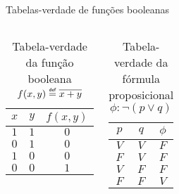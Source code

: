 \expandafter\documentclass\expandafter[table, usenames, svgnames, dvipsnames,14pt, \classopts]{beamer}
\newcommand\defeq{\mathrel{\overset{\makebox[0pt]{\mbox{\normalfont\tiny\sffamily def}}}{=}}}
\begin{document}
\begin{frame}{Tabelas-verdade de funções booleanas}

    \begin{columns}[c]
            \begin{center}
                \begin{table}
                    \caption{Tabela-verdade da função booleana $f(x,y) \defeq \overline{x + y}$}
                    \vspace{1em}
                    \begin{tabular}{cc|c}
                        $x$ & $y$ & $f(x,y)$\\
                        \hline
                        $1$ & $1$ & $0$\\
                        $0$ & $1$ & $0$\\
                        $1$ & $0$ & $0$\\
                        $0$ & $0$ & $1$\\
                    \end{tabular}
                \end{table}
            \end{center}

            \begin{center}
                \begin{table}
                    \caption{Tabela-verdade da fórmula proposicional $\phi: \lnot(p \lor q)$}
                    \vspace{1em}
                    \begin{tabular}{cc|c}
                        $p$ & $q$ & $\phi$\\
                        \hline
                        $V$ & $V$ & $F$\\
                        $F$ & $V$ & $F$\\
                        $V$ & $F$ & $F$\\
                        $F$ & $F$ & $V$\\
                    \end{tabular}
                \end{table}
            \end{center}
    \end{columns}
            
\end{frame}
\end{document}
